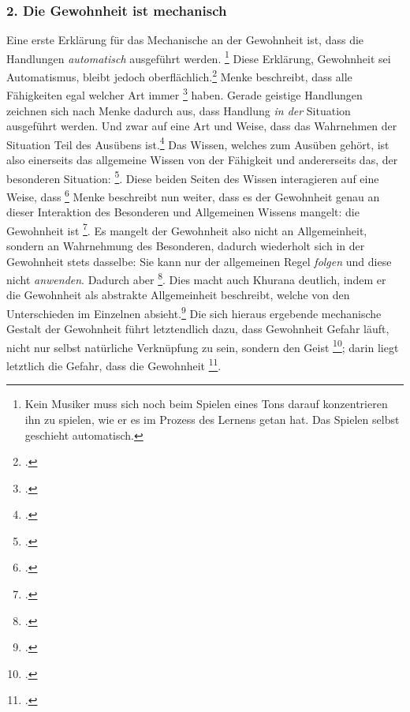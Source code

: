 \documentclass[12pt, a4paper, openany]{report}
\begin{document}
\subsubsection{2. Die Gewohnheit ist mechanisch}
Eine erste Erklärung für das Mechanische an der Gewohnheit ist, dass die Handlungen \emph{automatisch} ausgeführt werden.%
\footnote{
    Kein Musiker muss sich noch beim Spielen eines Tons darauf konzentrieren ihn zu spielen, wie er es im Prozess des Lernens getan hat. 
    Das Spielen selbst geschieht automatisch.
}
Diese Erklärung, Gewohnheit sei Automatismus, bleibt jedoch oberflächlich.\footcite[Vgl.][132]{menke_autonomie_2018}
Menke beschreibt, dass alle Fähigkeiten egal welcher Art immer \footcite[][132]{menke_autonomie_2018} haben. 
Gerade geistige Handlungen zeichnen sich nach Menke dadurch aus, dass Handlung \emph{in der} Situation ausgeführt werden.
Und zwar auf eine Art und Weise, dass das Wahrnehmen der Situation Teil des Ausübens ist.\footcite[Vgl][132]{menke_autonomie_2018} 
Das Wissen, welches zum Ausüben gehört, ist also einerseits das allgemeine Wissen von der Fähigkeit und andererseits das, der besonderen Situation: \footcite[][133]{menke_autonomie_2018}.
Diese beiden Seiten des Wissen interagieren auf eine Weise, dass \footcite[][133]{menke_autonomie_2018}
Menke beschreibt nun weiter, dass es der Gewohnheit genau an dieser Interaktion des Besonderen und Allgemeinen Wissens mangelt:
die Gewohnheit ist \footcite[][§ 410 Z, S. 188]{hegel_enzyklopädie_1969}.
Es mangelt der Gewohnheit also nicht an Allgemeinheit, sondern an Wahrnehmung des Besonderen, dadurch wiederholt sich in der Gewohnheit stets dasselbe:
Sie kann nur der allgemeinen Regel \emph{folgen} und diese nicht \emph{anwenden}. 
Dadurch aber \footcite[][134]{menke_autonomie_2018}.
Dies macht auch Khurana deutlich, indem er die Gewohnheit als abstrakte Allgemeinheit beschreibt, welche von den Unterschieden im Einzelnen absieht.\footcite[Vgl.][431]{khurana_freiheit_2017}
Die sich hieraus ergebende mechanische Gestalt der Gewohnheit führt letztendlich dazu, dass Gewohnheit Gefahr läuft, nicht nur selbst natürliche Verknüpfung zu sein, sondern den Geist \footcite[][430]{khurana_freiheit_2017};
darin liegt letztlich die Gefahr, dass die Gewohnheit \footcite[189]{khurana_freiheit_2017}.\\
\end{document}
